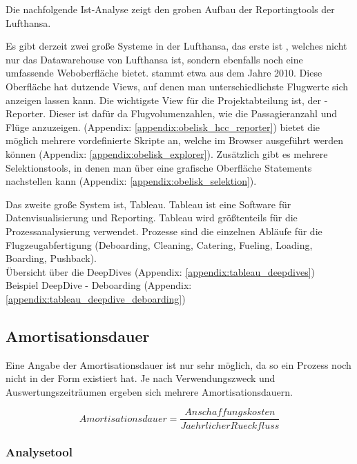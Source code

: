 		{

			\noindent
			Die nachfolgende Ist-Analyse zeigt den groben Aufbau der Reportingtools der Lufthansa.
		}
		{
			 \noindent
			 Es gibt derzeit zwei große Systeme in der Lufthansa, das erste ist , welches nicht nur das Datawarehouse von Lufthansa ist, sondern ebenfalls noch eine umfassende Weboberfläche bietet.  stammt etwa aus dem Jahre 2010.
			Diese Oberfläche hat dutzende Views, auf denen man unterschiedlichste Flugwerte sich anzeigen lassen kann. Die wichtigste View für die Projektabteilung ist, der -Reporter. Dieser ist dafür da Flugvolumenzahlen, wie die Passagieranzahl und Flüge anzuzeigen.
			(Appendix: \ref{appendix:obelisk_hcc_reporter})
			 bietet die möglich mehrere vordefinierte  Skripte an, welche im Browser ausgeführt werden können (Appendix: \ref{appendix:obelisk_explorer}).
			Zusätzlich gibt es mehrere Selektionstools, in denen man über eine grafische Oberfläche  Statements nachstellen kann (Appendix: \ref{appendix:obelisk_selektion}).
		}

		{
			\noindent
			Das zweite große System ist, Tableau. Tableau ist eine Software für Datenvisualisierung und Reporting. Tableau wird größtenteils für die Prozessanalysierung verwendet. Prozesse sind die einzelnen Abläufe für die Flugzeugabfertigung (Deboarding, Cleaning, Catering, Fueling, Loading, Boarding, Pushback).\\

		}
		{
			\noindent
			Übersicht über die DeepDives (Appendix: \ref{appendix:tableau_deepdives})\\
			Beispiel DeepDive - Deboarding (Appendix: \ref{appendix:tableau_deepdive_deboarding})
		}

	\subsection{Amortisationsdauer}

	{
		\noindent
		Eine Angabe der Amortisationsdauer ist nur sehr möglich, da so ein Prozess noch nicht in der Form existiert hat. Je nach Verwendungszweck und Auswertungszeiträumen ergeben sich mehrere Amortisationsdauern.

		\[ Amortisationsdauer = \frac{Anschaffungskosten}{Jaehrlicher Rueckfluss} \]

	}
	
	\subsubsection{Analysetool}

